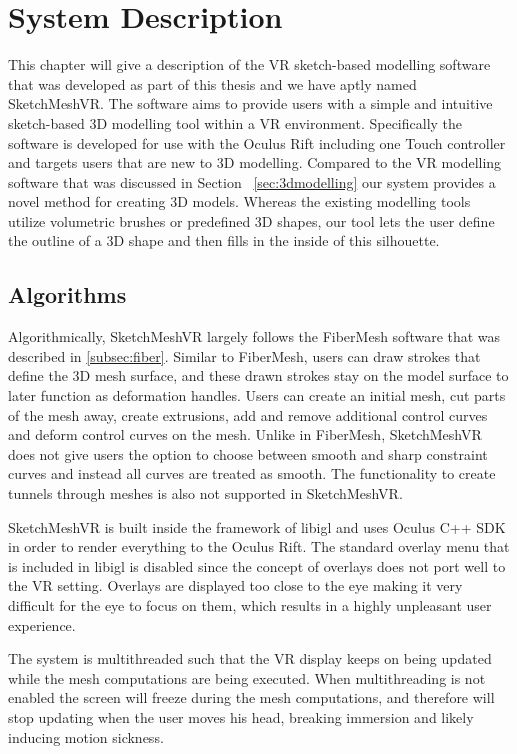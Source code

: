 \chapter{System Description}
\label{chap:system}
This chapter will give a description of the VR sketch-based modelling software that was developed as part of this thesis and we have aptly named SketchMeshVR. The software aims to provide users with a simple and intuitive sketch-based 3D modelling tool within a VR environment. Specifically the software is developed for use with the Oculus Rift including one Touch controller and targets users that are new to 3D modelling. Compared to the VR modelling software that was discussed in Section ~\ref{sec:3dmodelling} our system provides a novel method for creating 3D models. Whereas the existing modelling tools utilize volumetric brushes or predefined 3D shapes, our tool lets the user define the outline of a 3D shape and then fills in the inside of this silhouette. 

\section{Algorithms}
Algorithmically, SketchMeshVR largely follows the FiberMesh software that was described in \ref{subsec:fiber}. Similar to FiberMesh, users can draw strokes that define the 3D mesh surface, and these drawn strokes stay on the model surface to later function as deformation handles. Users can create an initial mesh, cut parts of the mesh away, create extrusions, add and remove additional control curves and deform control curves on the mesh. Unlike in FiberMesh, SketchMeshVR does not give users the option to choose between smooth and sharp constraint curves and instead all curves are treated as smooth. The functionality to create tunnels through meshes is also not supported in SketchMeshVR.  

SketchMeshVR is built inside the framework of libigl \cite{Jacobson2017} and uses Oculus C++ SDK in order to render everything to the Oculus Rift. The standard overlay menu that is included in libigl is disabled since the concept of overlays does not port well to the VR setting. Overlays are displayed too close to the eye making it very difficult for the eye to focus on them, which results in a highly unpleasant user experience. 

The system is multithreaded such that the VR display keeps on being updated while the mesh computations are being executed. When multithreading is not enabled the screen will freeze during the mesh computations, and therefore will stop updating when the user moves his head, breaking immersion and likely inducing motion sickness. 

